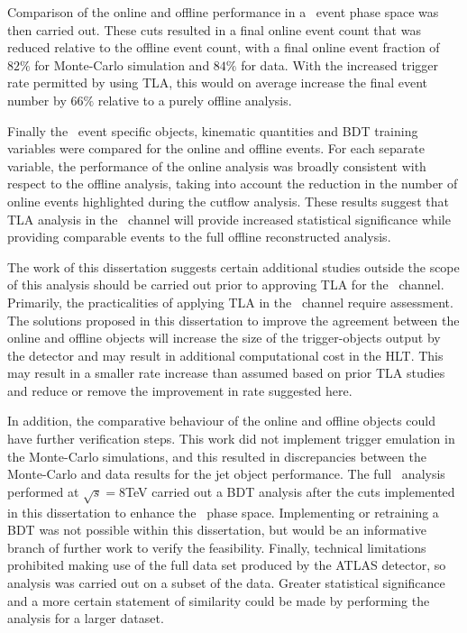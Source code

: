 Comparison of the online and offline performance in a \VBFHBB\ event phase space was then carried out. These cuts resulted in a final online event count that was reduced relative to the offline event count, with a final online event fraction of $82\%$ for Monte-Carlo simulation and $84\%$ for data. With the increased trigger rate permitted by using TLA, this would on average increase the final event number by $66\%$ relative to a purely offline analysis.

Finally the \VBFHBB\ event specific objects, kinematic quantities and BDT training variables were compared for the online and offline events. For each separate variable, the performance of the online analysis was broadly consistent with respect to the offline analysis, taking into account the reduction in the number of online events highlighted during the cutflow analysis. These results suggest that TLA analysis in the \VBFHBB\ channel will provide increased statistical significance while providing comparable events to the full offline reconstructed analysis.

The work of this dissertation suggests certain additional studies outside the scope of this analysis should be carried out prior to approving TLA for the \VBFHBB\ channel. Primarily, the practicalities of applying TLA in the \VBFHBB\ channel require assessment. The solutions proposed in this dissertation to improve the agreement between the online and offline objects will increase the size of the trigger-objects output by the detector and may result in additional computational cost in the HLT. This may result in a smaller rate increase than assumed based on prior TLA studies and reduce or remove the improvement in rate suggested here.

In addition, the comparative behaviour of the online and offline objects could have further verification steps. This work did not implement trigger emulation in the Monte-Carlo simulations, and this resulted in discrepancies between the Monte-Carlo and data results for the jet object performance. The full \VBFHBB\ analysis performed at $\sqrt{s}=8$TeV carried out a BDT analysis after the cuts implemented in this dissertation to enhance the \VBFHBB\ phase space. Implementing or retraining a BDT was not possible within this dissertation, but would be an informative branch of further work to verify the feasibility. Finally, technical limitations prohibited making use of the full data set produced by the ATLAS detector, so analysis was carried out on a subset of the data. Greater statistical significance and a more certain statement of similarity could be made by performing the analysis for a larger dataset.

